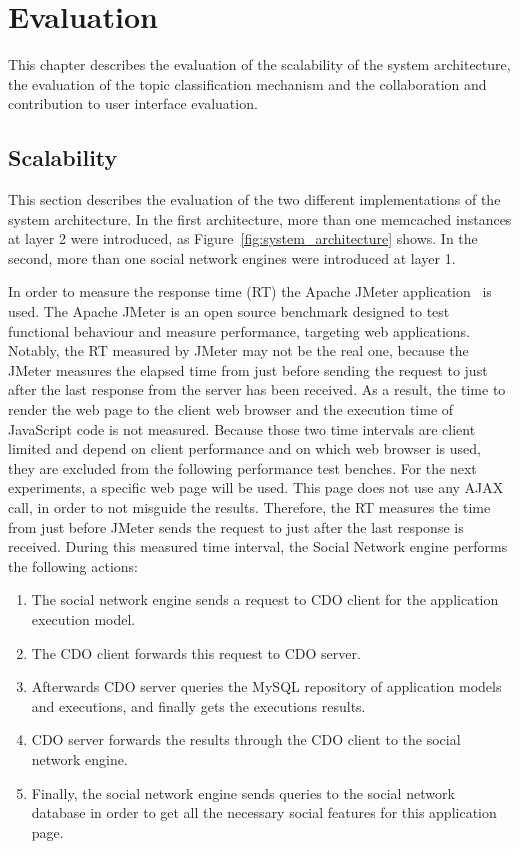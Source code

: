 \chapter{Evaluation}
\label{chapt:evaluation}
This chapter describes the evaluation of the scalability of the system architecture, the evaluation of the topic classification mechanism and the collaboration and contribution to user interface evaluation.  

\section{Scalability}
\label{sec:eval_scalability}
This section describes the evaluation of the two different implementations of the system architecture. In the first architecture, more than one memcached instances at layer 2 were introduced, as Figure~\ref{fig:system_architecture} shows. In the second, more than one social network engines were introduced at layer 1.

In order to measure the response time (RT) the Apache JMeter application~\cite{jmeter_url} is used. The Apache JMeter is an open source benchmark designed to test functional behaviour and  measure performance, targeting web applications. Notably, the RT measured by JMeter may not be the real one, because the JMeter measures the elapsed time from just before sending the request to just after the last response from the server has been received. As a result, the time to render the web page to the client web browser and the execution time of JavaScript code is not measured. Because those two time intervals are client limited and depend on client performance and on which web browser is used, they are excluded from the following performance test benches. For the next experiments, a specific web page will be used. This page does not use any AJAX call, in order to not misguide the results. Therefore, the RT measures the time from just before JMeter sends the request to just after the last response is received. During this measured time interval, the Social Network engine performs the following actions:
\begin{enumerate}[I]
\item The social network engine sends a request to CDO client for the application execution model.
\item The CDO client forwards this request to CDO server.
\item Afterwards CDO server queries the MySQL repository of application models and executions, and finally gets the executions results.
\item CDO server forwards the results through the CDO client to the social network engine.
\item Finally, the social network engine sends queries to the social network database in order to get all the necessary social features for this application page.
\end{enumerate}

